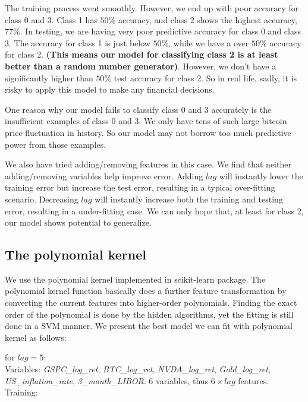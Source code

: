 \documentclass[9pt,twocolumn,twoside]{ilcss}
\begin{document}
The training process went smoothly. However, we end up with poor accuracy for class 0 and 3. Class 1 has $50\%$ accuracy, and class 2 shows the highest accuracy, $77\%$. In testing, we are having very poor predictive accuracy for class 0 and class 3. The accuracy for class 1 is just below $50\%$, while we have a over $50\%$ accuracy for class 2. \textbf{(This means our model for classifying class 2 is at least better than a random number generator)}. However, we don't have a significantly higher than $50\%$ test accuracy for class 2. So in real life, sadly, it is risky to apply this model to make any financial decisions.

One reason why our model fails to classify class 0 and 3 accurately is the insufficient examples of class 0 and 3. We only have tens of such large bitcoin price fluctuation in history. So our model may not borrow too much predictive power from those examples.

We also have tried adding/removing features in this case. We find that neither adding/removing variables help improve error. Adding $lag$ will instantly lower the training error but increase the test error, resulting in a typical over-fitting scenario. Decreasing $lag$ will instantly increase both the training and testing error, resulting in a under-fitting case. We can only hope that, at least for class 2, our model shows potential to generalize.

\subsection*{The polynomial kernel}
We use the polynomial kernel implemented in scikit-learn package. The polynomial kernel function basically does a further feature transformation by converting the current features into higher-order polynomials. Finding the exact order of the polynomial is done by the hidden algorithms, yet the fitting is still done in a SVM manner. We present the best model we can fit with polynomial kernel as follows:

\noindent  for $lag = 5$:
\smallskip\\
Variables: \textit{GSPC\_log\_ret}, \textit{BTC\_log\_ret}, \textit{NVDA\_log\_ret}, \textit{Gold\_log\_ret}, \textit{US\_inflation\_rate}, \textit{3\_month\_LIBOR}. 6 variables, thus $6\times lag$ features.
\smallskip\\
Training:
\end{document}
